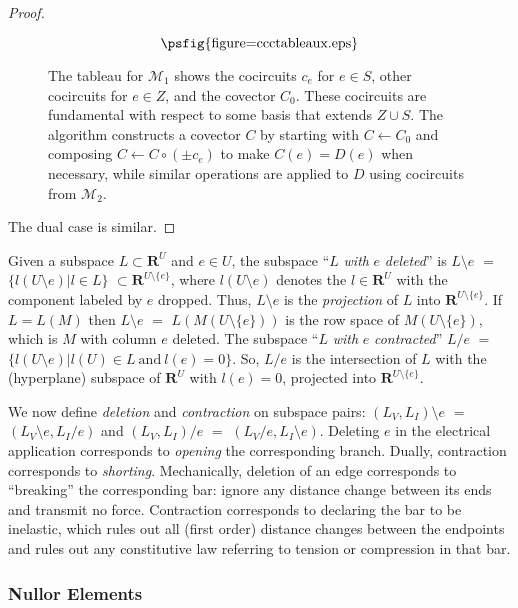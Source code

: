 \documentclass{amsproc-sunycstr}
\def\Reals{\ensuremath{\mathbf R}}
\theoremstyle{plain}
\theoremstyle{definition}
\theoremstyle{remark}
\begin{document}
\begin{proof}
\begin{figure}[tb]
\[
\mbox{\psfig{figure=ccctableaux.eps}}
\]
\caption{The tableau for ${\mathcal M}_1$
shows the cocircuits $c_e$ for $e\in S$, other cocircuits
for $e\in Z$,
%
%
and the covector $C_0$.  These cocircuits are fundamental
with respect to some basis that extends $Z\cup S$.  The algorithm
constructs 
%
%
a covector $C$ by starting with $C\leftarrow C_0$ and composing 
$C\leftarrow C\circ (\pm c_e)$ to make $C(e)=D(e)$ when necessary, while
similar operations are applied to $D$ using cocircuits from 
${\mathcal M}_2$.
}
\label{ccctableaux}
\end{figure}



The dual case is similar.
\end{proof}

Given a subspace $L\subset\Reals^U$ and $e\in U$, the subspace 
``$L$ \textit{with} $e$ \textit{deleted}''
is
$L\setminus e$ $=$ 
$\{ l(U\setminus e) | l\in L\}$
$\subset\Reals^{U\setminus \{e\}}$, 
where $l(U\setminus e)$ denotes the $l\in\Reals^U$
with the component labeled by $e$ dropped.  
Thus, $L\setminus e$ is the \textit{projection} of $L$ into 
$\Reals^{U\setminus \{e\}}$.
If $L=L(M)$ 
then $L\setminus e$ $=$ $L(M(U\setminus \{e\}))$ is the row space of 
$M(U\setminus \{e\})$, which is $M$ with column $e$ deleted.
The subspace  ``$L$ \textit{with} $e$ \textit{contracted}'' 
$L/e$ $=$ 
$\{ l(U\setminus e) | l(U)\in L \mathrm{\ and\ } l(e)=0\}$.  
So, $L/e$ is the 
intersection of $L$ with
the (hyperplane) subspace of $\Reals^U$ with $l(e)=0$,
projected into 
$\Reals^{U\setminus \{e\}}$.

We now define \textit{deletion} and \textit{contraction} on subspace pairs:  
$(L_V, L_I)\setminus e$ $=$ $(L_V\setminus e, L_I/e)$ and %
$(L_V, L_I)/e$ $=$ $(L_V/e, L_I\setminus e)$.  
Deleting $e$ in the electrical application
corresponds to \textit{opening} the corresponding branch.
Dually, 
contraction corresponds to \textit{shorting}.  
Mechanically,
deletion of an edge corresponds to ``breaking'' the corresponding bar:
ignore any distance change between its ends and transmit no force.
Contraction corresponds to 
declaring the bar to be inelastic, which rules out 
all (first order) distance changes between the endpoints and 
rules out any constitutive law referring to 
tension or compression in that bar.

\subsubsection{Nullor Elements}
\end{document}
